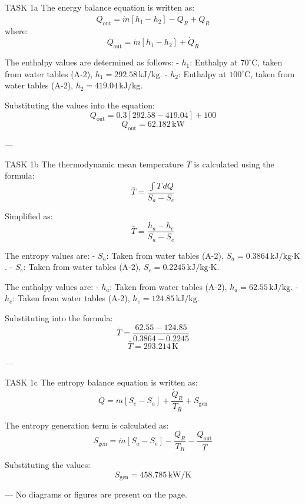 TASK 1a  
The energy balance equation is written as:  
\[
Q_{\text{out}} = \dot{m} \left[ h_1 - h_2 \right] - \dot{Q}_R + Q_R
\]  
where:  
\[
Q_{\text{out}} = \dot{m} \left[ h_1 - h_2 \right] + \dot{Q}_R
\]  

The enthalpy values are determined as follows:  
- \( h_1 \): Enthalpy at \( 70^\circ \text{C} \), taken from water tables (A-2), \( h_1 = 292.58 \, \text{kJ/kg} \).  
- \( h_2 \): Enthalpy at \( 100^\circ \text{C} \), taken from water tables (A-2), \( h_2 = 419.04 \, \text{kJ/kg} \).  

Substituting the values into the equation:  
\[
Q_{\text{out}} = 0.3 \left[ 292.58 - 419.04 \right] + 100
\]  
\[
Q_{\text{out}} = 62.182 \, \text{kW}
\]  

---

TASK 1b  
The thermodynamic mean temperature \( \bar{T} \) is calculated using the formula:  
\[
\bar{T} = \frac{\int T \, dQ}{S_a - S_e}
\]  

Simplified as:  
\[
\bar{T} = \frac{h_a - h_e}{S_a - S_e}
\]  

The entropy values are:  
- \( S_a \): Taken from water tables (A-2), \( S_a = 0.3864 \, \text{kJ/kg·K} \).  
- \( S_e \): Taken from water tables (A-2), \( S_e = 0.2245 \, \text{kJ/kg·K} \).  

The enthalpy values are:  
- \( h_a \): Taken from water tables (A-2), \( h_a = 62.55 \, \text{kJ/kg} \).  
- \( h_e \): Taken from water tables (A-2), \( h_e = 124.85 \, \text{kJ/kg} \).  

Substituting into the formula:  
\[
\bar{T} = \frac{62.55 - 124.85}{0.3864 - 0.2245}
\]  
\[
\bar{T} = 293.214 \, \text{K}
\]  

---

TASK 1c  
The entropy balance equation is written as:  
\[
Q = \dot{m} \left[ S_e - S_a \right] + \frac{\dot{Q}_R}{T_R} + S_{\text{gen}}
\]  

The entropy generation term is calculated as:  
\[
S_{\text{gen}} = \dot{m} \left[ S_a - S_e \right] - \frac{Q_R}{T_R} - \frac{Q_{\text{out}}}{\bar{T}}
\]  

Substituting the values:  
\[
S_{\text{gen}} = 458.785 \, \text{kW/K}
\]  

---  
No diagrams or figures are present on the page.
